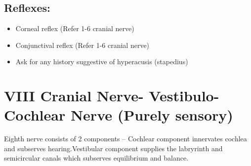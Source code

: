 \documentclass[a4paper,12pt,openany,oneside]{book}
\begin{document}
\subsection*{Reflexes:}
		\begin{itemize}
\item{Corneal reflex (Refer 1-6 cranial nerve)}
\item{Conjunctival reflex (Refer 1-6 cranial nerve)}
\item{Ask for any history suggestive of hyperacusis (stapedius)}
		\end{itemize}

		\section*{VIII Cranial Nerve- Vestibulo-Cochlear Nerve (Purely sensory)}

	Eighth nerve consists of 2 components – Cochlear component innervates cochlea and subserves hearing.Vestibular component supplies the labryrinth and semicircular canals which subserves equilibrium and balance.
\end{document}
